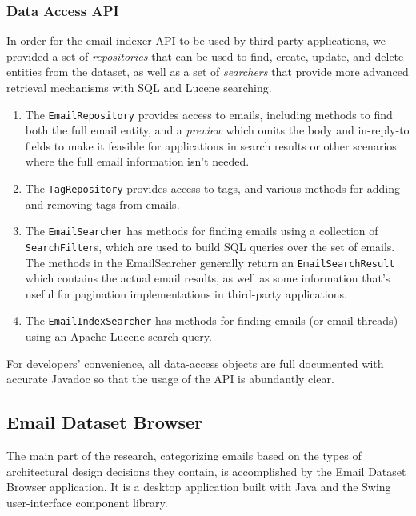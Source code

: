 \documentclass[a4paper, 12pt]{article}
\begin{document}
		\newpage %
		\subsubsection{Data Access API}
			In order for the email indexer API to be used by third-party applications, we provided a set of \textit{repositories} that can be used to find, create, update, and delete entities from the dataset, as well as a set of \textit{searchers} that provide more advanced retrieval mechanisms with SQL and Lucene searching.
			
			\begin{enumerate}
				\item The \texttt{EmailRepository} provides access to emails, including methods to find both the full email entity, and a \textit{preview} which omits the body and in-reply-to fields to make it feasible for applications in search results or other scenarios where the full email information isn't needed.
				\item The \texttt{TagRepository} provides access to tags, and various methods for adding and removing tags from emails.
				\item The \texttt{EmailSearcher} has methods for finding emails using a collection of \texttt{SearchFilter}s, which are used to build SQL queries over the set of emails. The methods in the EmailSearcher generally return an \texttt{EmailSearchResult} which contains the actual email results, as well as some information that's useful for pagination implementations in third-party applications.
				\item The \texttt{EmailIndexSearcher} has methods for finding emails (or email threads) using an Apache Lucene search query.
			\end{enumerate}
		
			For developers' convenience, all data-access objects are full documented with accurate Javadoc so that the usage of the API is abundantly clear.
	
	\newpage
	\subsection{Email Dataset Browser}
		\label{sec:email-dataset-browser}
		The main part of the research, categorizing emails based on the types of architectural design decisions they contain, is accomplished by the Email Dataset Browser application. It is a desktop application built with Java and the Swing user-interface component library.
		
\end{document}
